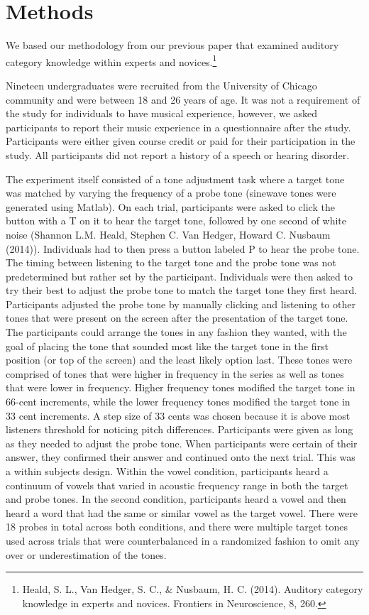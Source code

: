 \documentclass[
  man]{apa6}
\begin{document}
\hypertarget{methods}{%
\section{Methods}\label{methods}}

We based our methodology from our previous paper that examined auditory category knowledge within experts and novices.\footnote{Heald, S. L., Van Hedger, S. C., \& Nusbaum, H. C. (2014). Auditory category knowledge in experts and novices. Frontiers in Neuroscience, 8, 260.}

Nineteen undergraduates were recruited from the University of Chicago community and were between 18 and 26 years of age. It was not a requirement of the study for individuals to have musical experience, however, we asked participants to report their music experience in a questionnaire after the study. Participants were either given course credit or paid for their participation in the study. All participants did not report a history of a speech or hearing disorder.

The experiment itself consisted of a tone adjustment task where a target tone was matched by varying the frequency of a probe tone (sinewave tones were generated using Matlab). On each trial, participants were asked to click the button with a T on it to hear the target tone, followed by one second of white noise (Shannon L.M. Heald, Stephen C. Van Hedger, Howard C. Nusbaum (2014)). Individuals had to then press a button labeled P to hear the probe tone. The timing between listening to the target tone and the probe tone was not predetermined but rather set by the participant. Individuals were then asked to try their best to adjust the probe tone to match the target tone they first heard. Participants adjusted the probe tone by manually clicking and listening to other tones that were present on the screen after the presentation of the target tone. The participants could arrange the tones in any fashion they wanted, with the goal of placing the tone that sounded most like the target tone in the first position (or top of the screen) and the least likely option last. These tones were comprised of tones that were higher in frequency in the series as well as tones that were lower in frequency. Higher frequency tones modified the target tone in 66-cent increments, while the lower frequency tones modified the target tone in 33 cent increments. A step size of 33 cents was chosen because it is above most listeners threshold for noticing pitch differences. Participants were given as long as they needed to adjust the probe tone. When participants were certain of their answer, they confirmed their answer and continued onto the next trial. This was a within subjects design. Within the vowel condition, participants heard a continuum of vowels that varied in acoustic frequency range in both the target and probe tones. In the second condition, participants heard a vowel and then heard a word that had the same or similar vowel as the target vowel. There were 18 probes in total across both conditions, and there were multiple target tones used across trials that were counterbalanced in a randomized fashion to omit any over or underestimation of the tones.
\end{document}
